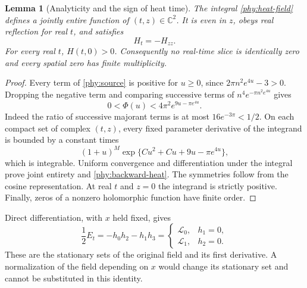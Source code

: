 \documentclass[11pt]{article}
\numberwithin{equation}{section}
\newtheorem{lemma}[theorem]{Lemma}
\theoremstyle{definition}
\theoremstyle{remark}
\begin{document}
\begin{lemma}[Analyticity and the sign of heat time]
\label{phy:entire}
The integral \eqref{phy:heat-field} defines a jointly entire function of
$(t,z)\in\mathbb C^2$.  It is even in $z$, obeys real reflection for real
$t$, and satisfies
\begin{equation}
 H_t=-H_{zz}.
 \label{phy:backward-heat}
\end{equation}
For every real $t$, $H(t,0)>0$.  Consequently no real-time slice is
identically zero and every spatial zero has finite multiplicity.
\end{lemma}
\begin{proof}
Every term of \eqref{phy:source} is positive for $u\ge0$, since
$2\pi n^2e^{4u}-3>0$.  Dropping the negative term and comparing successive
terms of $n^4e^{-\pi n^2e^{4u}}$ gives
\[
 0<\Phi(u)<4\pi^2e^{9u-\pi e^{4u}}.
\]
Indeed the ratio of successive majorant terms is at most
$16e^{-3\pi}<1/2$.  On each compact set of complex $(t,z)$, every fixed
parameter derivative of the integrand is bounded by a constant times
\[
 (1+u)^M\exp\{C u^2+C u+9u-\pi e^{4u}\},
\]
which is integrable.  Uniform convergence and differentiation under the
integral prove joint entirety and \eqref{phy:backward-heat}.  The symmetries
follow from the cosine representation.  At real $t$ and $z=0$ the
integrand is strictly positive.  Finally, zeros of a nonzero holomorphic
function have finite order.
\end{proof}

Direct differentiation, with $x$ held fixed, gives
\begin{equation}
 \frac12E_t=-h_0h_2-h_1h_3
 =\begin{cases}\mathcal L_0,&h_1=0,\\
                 \mathcal L_1,&h_2=0.
   \end{cases}
 \label{phy:radial-energy}
\end{equation}
These are the stationary sets of the original field and its first
derivative.  A normalization of the field depending on $x$ would change
its stationary set and cannot be substituted in this identity.
\end{document}
